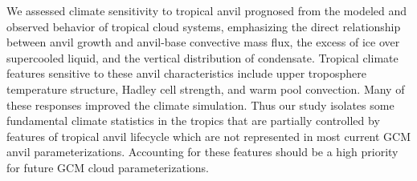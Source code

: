 \documentclass[twocolumn,twoside,final,10pt]{article}
\begin{document}
We assessed climate sensitivity to tropical anvil prognosed from the
modeled and observed behavior of tropical cloud systems, emphasizing
the direct relationship between anvil growth and anvil-base convective
mass flux, the excess of ice over supercooled liquid, and the vertical
distribution of condensate. 
Tropical climate features sensitive to these anvil characteristics
include upper troposphere temperature structure, Hadley cell strength,
and warm pool convection. 
Many of these responses improved the climate simulation.
Thus our study isolates some fundamental climate statistics in the 
tropics that are partially controlled by features of tropical anvil 
lifecycle which are not represented in most current GCM anvil 
parameterizations. 
Accounting for these features should be a high priority for future GCM
cloud parameterizations.






\end{document}

